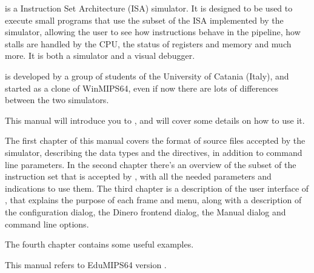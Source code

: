 \EM{} is a \MS{} Instruction Set Architecture (ISA) simulator. It is designed to
be used to execute small programs that use the subset of the \MS{} ISA
implemented by the simulator, allowing the user to see how instructions behave
in the pipeline, how stalls are handled by the CPU, the status of registers and
memory and much more. It is both a simulator and a visual debugger.

\EM{} is developed by a group of students of the University of Catania (Italy),
and started as a clone of WinMIPS64, even if now there are lots of differences
between the two simulators.

This manual will introduce you to \EM{}, and will cover some details on how to
use it.

The first chapter of this manual covers the format of source files accepted by
the simulator, describing the data types and the directives, in addition to
command line parameters. In the second chapter there's an overview of the subset
of the \MS{} instruction set that is accepted by \EM{}, with all the needed
parameters and indications to use them. The third chapter is a description of
the user interface of \EM{}, that explains the purpose of each frame and menu,
along with a description of the configuration dialog, the Dinero frontend
dialog, the Manual dialog and command line options. 

The fourth chapter contains some useful examples.

This manual refers to EduMIPS64 version \EV.
